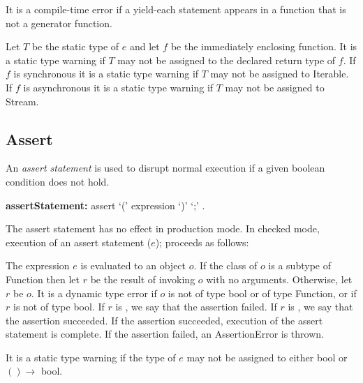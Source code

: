 \documentclass{article}
\newcommand{\code}[1]{{\sf #1}}
\begin{document}
\LMHash{}
It is a compile-time error if a yield-each statement appears in a function that is not a generator function.

\LMHash{}
Let $T$ be the static type of $e$ and let $f$ be the immediately enclosing function.  It is a static type warning if $T$ may not be assigned to the declared return type of $f$.  If $f$ is synchronous it is a static  type warning if $T$ may not be assigned to \code{Iterable}.  If $f$ is asynchronous it is a static  type warning if $T$ may not be assigned to \code{Stream}.


\subsection{ Assert}

\LMHash{}
An {\em assert statement} is used to disrupt normal execution if a given boolean condition does not hold.

\begin{grammar}
{\bf assertStatement:}
   assert `(' expression `)' `{\escapegrammar ;}'
      .
\end{grammar}

\LMHash{}
The assert statement has no effect in production mode. In checked mode, execution of an assert statement \code{\ASSERT{}($e$);} proceeds as follows:

\LMHash{}
The expression $e$ is evaluated to an object $o$. If the class of $o$ is a subtype of \code{Function} then let $r$ be the result of invoking $o$ with no arguments. Otherwise, let $r$ be $o$.
It is a dynamic type error if $o$ is not of type \code{bool} or of type \code{Function}, or if $r$ is not of type \code{bool}.  If $r$ is \FALSE{}, we say that the assertion failed. If $r$ is \TRUE{}, we say that the assertion succeeded. If the assertion succeeded, execution of the assert statement is complete. If the assertion failed, an \code{AssertionError} is thrown.


\LMHash{}
 It is a static type warning if the type of $e$ may not be assigned to either  \code{bool} or $() \rightarrow$ \code{bool}.

\end{document}
